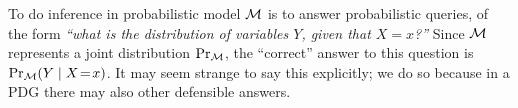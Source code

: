 \documentclass[twoside]{article}
\begin{document}
To do inference in probabilistic model $\cal M$ is to answer probabilistic queries, of the form
\textit{``what is the distribution of variables $Y$, given that $X\!=\!x$?''}
%
Since $\cal M$ represents a joint distribution $\Pr_{\cal M}$, 
the ``correct'' answer to this question is $\Pr_{\cal M}(Y \mid X\!=\!x)$.
It may seem strange to say this explicitly; we do so because
in a PDG there may also other defensible answers.
\end{document}
